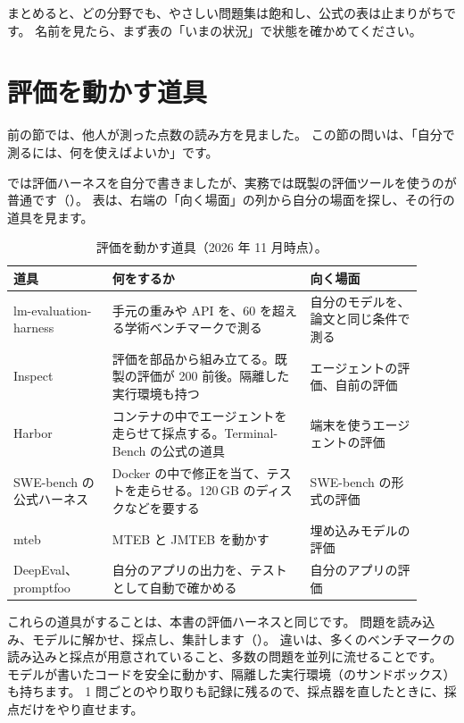 まとめると、どの分野でも、やさしい問題集は飽和し、公式の表は止まりがちです。
名前を見たら、まず表の「いまの状況」で状態を確かめてください。

\section{評価を動かす道具}\label{sec:bm-tools}

前の節では、他人が測った点数の読み方を見ました。
この節の問いは、「自分で測るには、何を使えばよいか」です。

では評価ハーネスを自分で書きましたが、実務では既製の評価ツールを使うのが普通です（）。
表は、右端の「向く場面」の列から自分の場面を探し、その行の道具を見ます。

\begin{table}[htbp]
\centering\small\setlength{\tabcolsep}{4pt}
\caption{評価を動かす道具（2026 年 11 月時点）。}
\label{tab:bm-tools}
\begin{tabular}{@{}>{\raggedright\arraybackslash}p{0.22\linewidth}>{\raggedright\arraybackslash}p{0.44\linewidth}>{\raggedright\arraybackslash}p{0.25\linewidth}@{}}
\toprule
道具 & 何をするか & 向く場面 \\
\midrule
lm-evaluation-harness \cite{biderman2024lessons} & 手元の重みや API を、60 を超える学術ベンチマークで測る & 自分のモデルを、論文と同じ条件で測る \\
\addlinespace[0.2em]
Inspect & 評価を部品から組み立てる。既製の評価が 200 前後。隔離した実行環境も持つ & エージェントの評価、自前の評価 \\
\addlinespace[0.2em]
Harbor & コンテナの中でエージェントを走らせて採点する。Terminal-Bench の公式の道具 & 端末を使うエージェントの評価 \\
\addlinespace[0.2em]
SWE-bench の公式ハーネス & Docker の中で修正を当て、テストを走らせる。120\,GB のディスクなどを要する & SWE-bench の形式の評価 \\
\addlinespace[0.2em]
mteb & MTEB と JMTEB を動かす & 埋め込みモデルの評価 \\
\addlinespace[0.2em]
DeepEval、promptfoo & 自分のアプリの出力を、テストとして自動で確かめる & 自分のアプリの評価 \\
\bottomrule
\end{tabular}
\end{table}

これらの道具がすることは、本書の評価ハーネスと同じです。
問題を読み込み、モデルに解かせ、採点し、集計します（）。
違いは、多くのベンチマークの読み込みと採点が用意されていること、多数の問題を並列に流せることです。
モデルが書いたコードを安全に動かす、隔離した実行環境（のサンドボックス）も持ちます。
1 問ごとのやり取りも記録に残るので、採点器を直したときに、採点だけをやり直せます。

